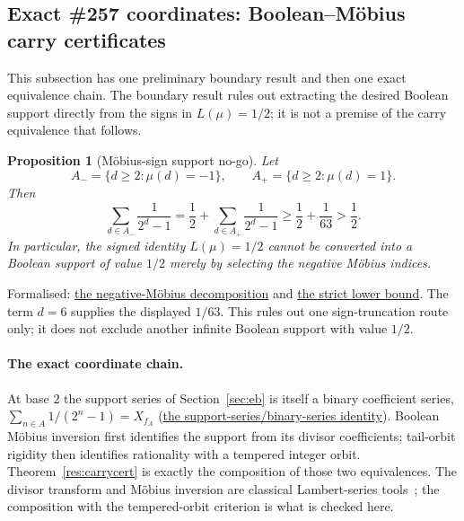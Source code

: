\documentclass[11pt]{article}
\newcommand{\commit}{312b96c0d149ed466725c62d4ef24cfc91bca34e}
\newcommand{\repobase}{https://github.com/wcook04/plectis-lean-erdos249-257/blob/\commit}
\newcommand{\PK}{Erdos249257}
\newcommand{\lword}[4]{\href{\repobase/\PK/#1\#L#2}{#4}}
\newtheorem{proposition}[theorem]{Proposition}
\theoremstyle{definition}
\theoremstyle{remark}
\begin{document}
\subsection{Exact \#257 coordinates: Boolean--M\"obius carry certificates}
\label{app:carry-boolean}

This subsection has one preliminary boundary result and then one exact
equivalence chain.  The boundary result rules out extracting the desired
Boolean support directly from the signs in \(L(\mu)=1/2\); it is not a premise
of the carry equivalence that follows.

\begin{proposition}[M\"obius-sign support no-go]\label{res:mobiussignnogo}
Let
\[
 A_-=\{d\ge2:\mu(d)=-1\},
 \qquad A_+=\{d\ge2:\mu(d)=1\}.
\]
Then
\[
 \sum_{d\in A_-}\frac1{2^d-1}
 =\frac12+\sum_{d\in A_+}\frac1{2^d-1}
 \ge\frac12+\frac1{63}>\frac12.
\]
In particular, the signed identity \(L(\mu)=1/2\) cannot be converted into a
Boolean support of value \(1/2\) merely by selecting the negative M\"obius
indices.
\end{proposition}
\noindent Formalised:
\lword{MobiusSignSupportNoGo.lean}{111}{tsum_negativeMobius_eq_half_add_positiveMobiusTail}{the negative-M\"obius decomposition}
and
\lword{MobiusSignSupportNoGo.lean}{150}{half_add_one_div_sixty_three_le_tsum_negativeMobius}{the strict lower bound}.
The term \(d=6\) supplies the displayed \(1/63\).  This rules out one
sign-truncation route only; it does not exclude another infinite Boolean
support with value \(1/2\).

\paragraph{The exact coordinate chain.}
At base $2$ the support series of Section~\ref{sec:eb} is itself a binary
coefficient series, $\sum_{n\in A}1/(2^n-1)=X_{f_A}$
(\lword{BooleanMobiusCarry.lean}{376}{erdosSupportSeries_two_eq_binaryCoeffSeries}{the support-series/binary-series identity}).
Boolean M\"obius inversion first identifies the support from its divisor
coefficients; tail-orbit rigidity then identifies rationality with a tempered
integer orbit.  Theorem~\ref{res:carrycert} is exactly the composition of
those two equivalences.  The divisor transform and M\"obius inversion are
classical Lambert-series tools~\cite{apostol,merca2017,mercaschmidt}; the
composition with the tempered-orbit criterion is what is checked here.
\end{document}
